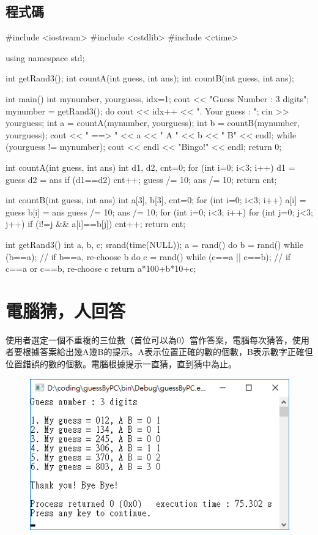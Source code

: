 \documentclass[12pt,a4paper]{article}
\begin{document}
\subsection{程式碼}
\begin{cppcode}
	#include <iostream>
	#include <cstdlib>
	#include <ctime>
	
	using namespace std;
	
	int getRand3();
	int countA(int guess, int ans);
	int countB(int guess, int ans);
	
	int main()
	{
		int mynumber, yourguess, idx=1;
		cout << "Guess Number : 3 digits\n\n";
		mynumber = getRand3();
		do {
			cout << idx++ << ". Your guess : ";
			cin >> yourguess;
			int a = countA(mynumber, yourguess);
			int b = countB(mynumber, yourguess);
			cout << "   ==> " << a << " A " << b << " B" << endl;
		} while (yourguess != mynumber);
		cout << endl << "Bingo!" << endl;
		return 0;
	}
	
	int countA(int guess, int ans)
	{
		int d1, d2, cnt=0;
		for (int i=0; i<3; i++) {
			d1 = guess %
			d2 = ans %
			if (d1==d2) cnt++;
			guess /= 10;
			ans /= 10;
		}
		return cnt;
	}
	
	int countB(int guess, int ans)
	{
		int a[3], b[3], cnt=0;
		for (int i=0; i<3; i++) {
			a[i] = guess %
			b[i] = ans %
			guess /= 10;
			ans /= 10;
		}
		for (int i=0; i<3; i++) {
			for (int j=0; j<3; j++) {
				if (i!=j && a[i]==b[j]) cnt++;
			}
		}
		return cnt;
	}
	
	int getRand3()
	{
		int a, b, c;
		srand(time(NULL));
		a = rand() %
		do {
			b = rand() %
		} while (b==a);  // if b==a, re-choose b
		do {
			c = rand() %
		} while (c==a || c==b);  // if c==a or c==b, re-choose c
		return a*100+b*10+c;
	}
\end{cppcode}

\vspace{1cm}
\section{電腦猜，人回答}

使用者選定一個不重複的三位數（首位可以為0）當作答案，電腦每次猜答，使用者要根據答案給出幾A幾B的提示。A表示位置正確的數的個數，B表示數字正確但位置錯誤的數的個數。電腦根據提示一直猜，直到猜中為止。
\begin{figure}[H]
	\centering
	\includegraphics{Fig/PC}
\end{figure}
\end{document}
